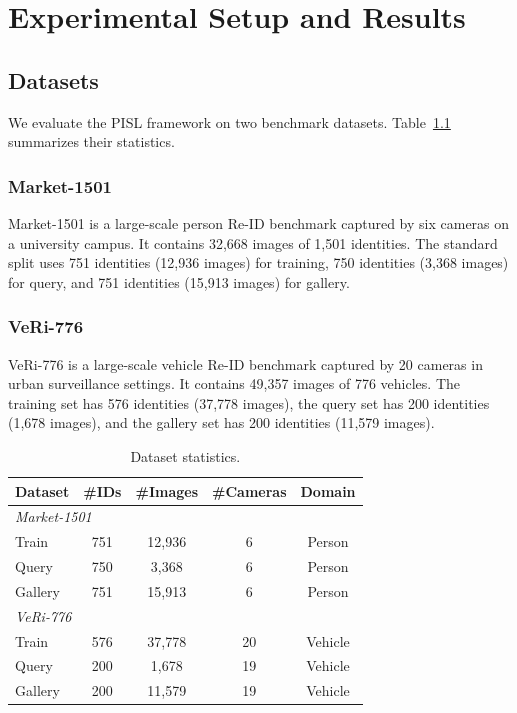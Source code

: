 \chapter{Experimental Setup and Results}

\section{Datasets}

We evaluate the PISL framework on two benchmark datasets. Table~\ref{tab:datasets} summarizes their statistics.

\subsection{Market-1501}
Market-1501 \cite{zheng2015scalable} is a large-scale person Re-ID benchmark captured by six cameras on a university campus. It contains 32,668 images of 1,501 identities. The standard split uses 751 identities (12,936 images) for training, 750 identities (3,368 images) for query, and 751 identities (15,913 images) for gallery.

\subsection{VeRi-776}
VeRi-776 \cite{liu2016deepveri} is a large-scale vehicle Re-ID benchmark captured by 20 cameras in urban surveillance settings. It contains 49,357 images of 776 vehicles. The training set has 576 identities (37,778 images), the query set has 200 identities (1,678 images), and the gallery set has 200 identities (11,579 images).

\begin{table}[H]
    \centering
    \caption{Dataset statistics.}
    \label{tab:datasets}
    \begin{tabular}{l c c c c}
        \toprule
        \textbf{Dataset} & \textbf{\#IDs} & \textbf{\#Images} & \textbf{\#Cameras} & \textbf{Domain} \\
        \midrule
        \multicolumn{5}{l}{\textit{Market-1501}} \\
        \quad Train   & 751 & 12,936 & 6  & Person \\
        \quad Query   & 750 & 3,368  & 6  & Person \\
        \quad Gallery & 751 & 15,913 & 6  & Person \\
        \midrule
        \multicolumn{5}{l}{\textit{VeRi-776}} \\
        \quad Train   & 576 & 37,778 & 20 & Vehicle \\
        \quad Query   & 200 & 1,678  & 19 & Vehicle \\
        \quad Gallery & 200 & 11,579 & 19 & Vehicle \\
        \bottomrule
    \end{tabular}
\end{table}

